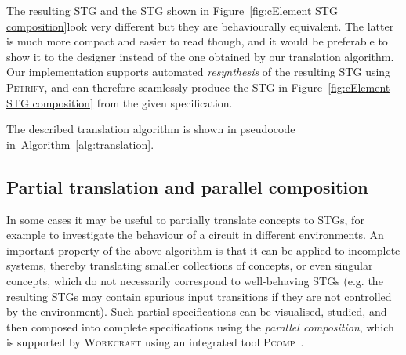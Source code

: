 \documentclass[british, journal]{IEEEtran}
\newcommand{\noun}[1]{\textsc{#1}}
\begin{document}
The resulting STG and the STG shown in Figure~\ref{fig:cElement STG composition}look very different but they are behaviourally equivalent. The latter is much
more
compact and easier to read though, and it would be preferable to show it to the
designer instead of the one obtained by our translation algorithm. Our
implementation supports automated \emph{resynthesis} of the resulting STG
using \noun{Petrify}, and can therefore seamlessly produce the STG in
Figure~\ref{fig:cElement STG composition} from the given specification.


%

The described translation algorithm is shown in pseudocode
in~Algorithm~\ref{alg:translation}.

\vspace{-1mm}
\subsection{Partial translation and parallel composition}

In some cases it may be useful to partially translate concepts to STGs, for
example to investigate the behaviour of a circuit
in different environments. An important property of the above algorithm is
that it can be applied to incomplete systems, thereby translating
smaller collections of concepts, or even singular concepts, which do not
necessarily correspond to well-behaving STGs (e.g. the resulting STGs may
contain
spurious input transitions if they are not controlled by the environment).
Such partial specifications can be visualised, studied, and then composed into
complete specifications using the \emph{parallel composition}, which is
supported
by \noun{Workcraft} using an integrated tool \noun{Pcomp}~\cite{PCOMP}.
\end{document}
